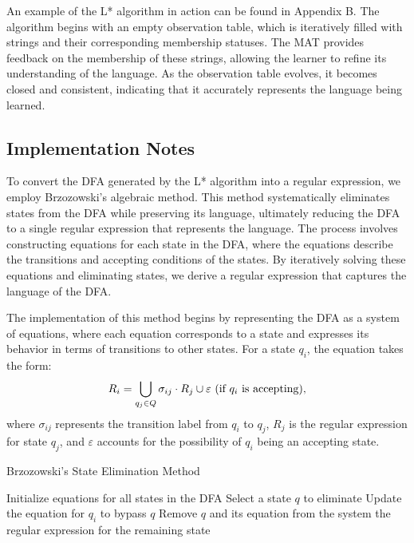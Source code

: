 \indent\indent An example of the L* algorithm in action can be found in Appendix B. The algorithm begins with an empty observation table, which is iteratively filled with strings and their corresponding membership statuses. The MAT provides feedback on the membership of these strings, allowing the learner to refine its understanding of the language. As the observation table evolves, it becomes closed and consistent, indicating that it accurately represents the language being learned.


\subsection{Implementation Notes}

\indent\indent To convert the DFA generated by the L* algorithm into a regular expression, we employ Brzozowski's algebraic method. This method systematically eliminates states from the DFA while preserving its language, ultimately reducing the DFA to a single regular expression that represents the language. The process involves constructing equations for each state in the DFA, where the equations describe the transitions and accepting conditions of the states. By iteratively solving these equations and eliminating states, we derive a regular expression that captures the language of the DFA.

\indent\indent The implementation of this method begins by representing the DFA as a system of equations, where each equation corresponds to a state and expresses its behavior in terms of transitions to other states. For a state \( q_i \), the equation takes the form:
\[
R_i = \bigcup_{q_j \in Q} \sigma_{ij} \cdot R_j \cup \varepsilon \text{ (if \( q_i \) is accepting)},
\]
where \( \sigma_{ij} \) represents the transition label from \( q_i \) to \( q_j \), \( R_j \) is the regular expression for state \( q_j \), and \( \varepsilon \) accounts for the possibility of \( q_i \) being an accepting state.

\begin{algorithm}
    \caption{Brzozowski's State Elimination Method}
    \label{alg:brzozowski}
    \begin{algorithmic}[1]
    \State Initialize equations for all states in the DFA
        \State Select a state \( q \) to eliminate
            \State Update the equation for \( q_i \) to bypass \( q \)
        \EndFor
        \State Remove \( q \) and its equation from the system
    \EndWhile
    \State \Return the regular expression for the remaining state
    \end{algorithmic}
\end{algorithm}

